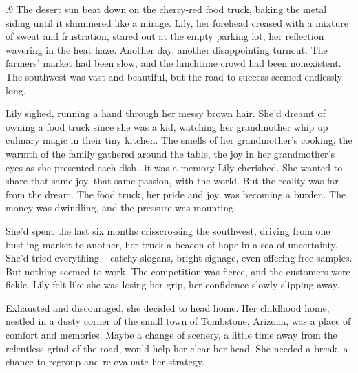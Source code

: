 \documentclass{article}
\newcommand{\Agentsroomzs}{\textsc{Agents' Room$_{ZS}$}}
\begin{document}
    \begin{tcolorbox}[colback=white, colframe=gray!30!white, coltitle=black, parskip=5mm, title=
    \textbf{System output: \Agentsroomzs}, breakable]
    \scriptsize
    \begin{spacing}{.9}
    The desert sun beat down on the cherry-red food truck, baking the metal siding until it shimmered like a mirage.  Lily, her forehead creased with a mixture of sweat and frustration, stared out at the empty parking lot, her reflection wavering in the heat haze.  Another day, another disappointing turnout.  The farmers' market had been slow, and the lunchtime crowd had been nonexistent.  The southwest was vast and beautiful, but the road to success seemed endlessly long.\\\par
    
Lily sighed, running a hand through her messy brown hair.  She'd dreamt of owning a food truck since she was a kid, watching her grandmother whip up culinary magic in their tiny kitchen.  The smells of her grandmother’s cooking, the warmth of the family gathered around the table, the joy in her grandmother’s eyes as she presented each dish...it was a memory Lily cherished.  She wanted to share that same joy, that same passion, with the world.  But the reality was far from the dream.  The food truck, her pride and joy, was becoming a burden.  The money was dwindling, and the pressure was mounting.\\\par

She’d spent the last six months crisscrossing the southwest, driving from one bustling market to another, her truck a beacon of hope in a sea of uncertainty.  She’d tried everything – catchy slogans, bright signage, even offering free samples.  But nothing seemed to work.  The competition was fierce, and the customers were fickle.  Lily felt like she was losing her grip, her confidence slowly slipping away. \\\par

Exhausted and discouraged, she decided to head home.  Her childhood home, nestled in a dusty corner of the small town of Tombstone, Arizona, was a place of comfort and memories.  Maybe a change of scenery, a little time away from the relentless grind of the road, would help her clear her head.  She needed a break, a chance to regroup and re-evaluate her strategy.\\\par


\end{spacing}
\end{tcolorbox}
\end{document}
